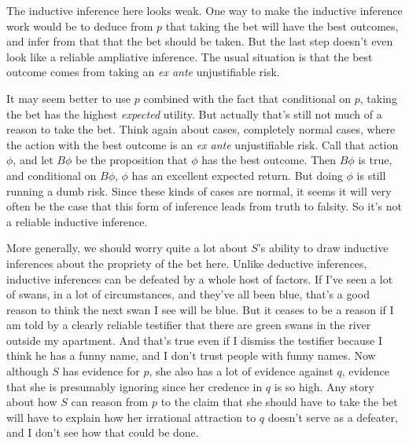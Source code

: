{The inductive inference here looks weak. One way to make the inductive inference work would be to deduce from \(p\) that taking the bet will have the best outcomes, and infer from that that the bet should be taken. But the last step doesn't even look like a reliable ampliative inference. The usual situation is that the best outcome comes from taking an \textit{ex ante} unjustifiable risk.

It may seem better to use \(p\) combined with the fact that conditional on \(p\), taking the bet has the highest \textit{expected} utility. But actually that's still not much of a reason to take the bet. Think again about cases, completely normal cases, where the action with the best outcome is an \textit{ex ante} unjustifiable risk. Call that action \(\phi\), and let \(B \phi\) be the proposition that \(\phi\) has the best outcome. Then \(B \phi\) is true, and conditional on \(B \phi\), \(\phi\) has an excellent expected return. But doing \(\phi\) is still running a dumb risk. Since these kinds of cases are normal, it seems it will very often be the case that this form of inference leads from truth to falsity. So it's not a reliable inductive inference.

More generally, we should worry quite a lot about \(S\)'s ability to draw inductive inferences about the propriety of the bet here. Unlike deductive inferences, inductive inferences can be defeated by a whole host of factors. If I've seen a lot of swans, in a lot of circumstances, and they've all been blue, that's a good reason to think the next swan I see will be blue. But it ceases to be a reason if I am told by a clearly reliable testifier that there are green swans in the river outside my apartment. And that's true even if I dismiss the testifier because I think he has a funny name, and I don't trust people with funny names. Now although \(S\) has evidence for \(p\), she also has a lot of evidence against \(q\), evidence that she is presumably ignoring since her credence in \(q\) is so high. Any story about how \(S\) can reason from \(p\) to the claim that she should have to take the bet will have to explain how her irrational attraction to \(q\) doesn't serve as a defeater, and I don't see how that could be done.}

